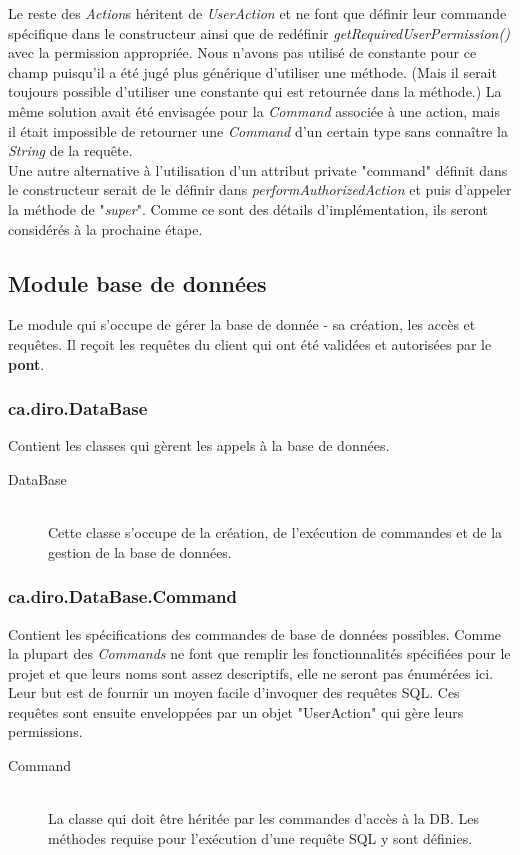 \documentclass[10pt,a4paper]{report}
\begin{document}
\begin{flushleft}
\begin{description}
\end{description}
\bigskip
Le reste des \emph{Action}s héritent de \emph{UserAction} et ne font que définir leur commande spécifique dans le constructeur ainsi que de redéfinir \emph{getRequiredUserPermission()} avec la permission appropriée. Nous n'avons pas utilisé de constante pour ce champ puisqu'il a été jugé plus générique d'utiliser une méthode. (Mais il serait toujours possible d'utiliser une constante qui est retournée dans la méthode.) La même solution avait été envisagée pour la \emph{Command} associée à une action, mais il était impossible de retourner une \emph{Command} d'un certain type sans connaître la \emph{String} de la requête.\\
\medskip
Une autre alternative à l'utilisation d'un attribut private "command" définit dans le constructeur serait de le définir dans \emph{performAuthorizedAction} et puis d'appeler la méthode de "\emph{super}". Comme ce sont des détails d'implémentation, ils seront considérés à la prochaine étape.\\
\bigskip
\subsection*{Module base de données}
Le module qui s'occupe de gérer la base de donnée - sa création, les accès et requêtes. Il reçoit les requêtes du client qui ont été validées et autorisées par le \textbf{pont}.\\
\bigskip
\subsubsection*{ca.diro.DataBase}
Contient les classes qui gèrent les appels à la base de données.\\
\begin{description}
\item[DataBase] \hfill \\ Cette classe s'occupe de la création, de l'exécution de commandes et de la gestion de la base de données.
\end{description}
\bigskip
\subsubsection*{ca.diro.DataBase.Command}
Contient les spécifications des commandes de base de données possibles. Comme la plupart des \emph{Commands} ne font que remplir les fonctionnalités spécifiées pour le projet et que leurs noms sont assez descriptifs, elle ne seront pas énumérées ici. Leur but est de fournir un moyen facile d'invoquer des requêtes SQL. Ces requêtes sont ensuite enveloppées par un objet "UserAction" qui gère leurs permissions.\\
\begin{description}
\item[Command] \hfill \\ La classe qui doit être héritée par les commandes d'accès à la DB. Les méthodes requise pour l'exécution d'une requête SQL y sont définies.
\end{description}
\bigskip

\end{flushleft}
\end{document}
